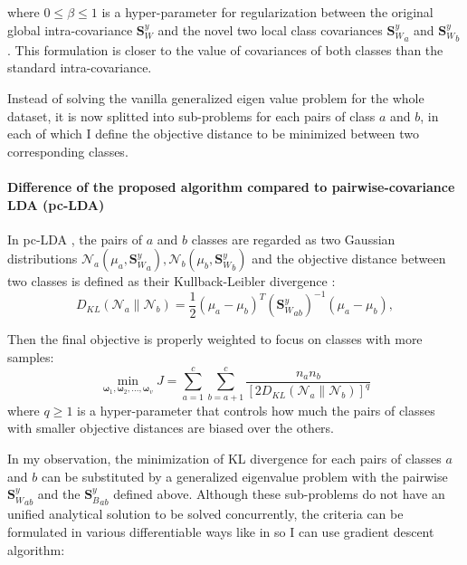     where $0\le\beta\le1$ is a hyper-parameter for regularization between the original global intra-covariance ${\boldsymbol{S}_W^y}$ and the novel two local class covariances ${\boldsymbol{S}_W^y}_a$ and ${\boldsymbol{S}_W^y}_b$.
    This formulation is closer to the value of covariances of both classes than the standard intra-covariance.

    Instead of solving the vanilla generalized eigen value problem for the whole dataset, it is now splitted into sub-problems for each pairs of class $a$ and $b$, in each of which I define the objective distance to be minimized between two corresponding classes.

    \paragraph{Difference of the proposed algorithm compared to pairwise-covariance LDA (pc-LDA)}
        In pc-LDA \cite{kong2014pairwise}, the pairs of $a$ and $b$ classes are regarded as two Gaussian distributions $\mathcal{N}_a(\mu_a,{\boldsymbol{S}_W^y}_a), \mathcal{N}_b(\mu_b,{\boldsymbol{S}_W^y}_b)$ and the objective distance between two classes is defined as their Kullback-Leibler divergence \cite{kullback1951}:
        \begin{equation}
            D_{KL}\left(\mathcal{N}_a\parallel\mathcal{N}_b\right)=\frac{1}{2}\left(\mu_a-\mu_b\right)^{T}{\left({\boldsymbol{S}_W^y}_{ab}\right)}^{-1}\left(\mu_a-\mu_b\right),
        \end{equation}

        Then the final objective is properly weighted to focus on classes with more samples:
        \begin{equation}
            \operatorname*{min}_{\boldsymbol{\omega}_1, \boldsymbol{\omega}_2,...,
            \boldsymbol{\omega}_v}{J}=\sum_{a=1}^{c}\sum_{b=a+1}^{c}{\frac{n_an_b}{{[2D_{KL}\left(\mathcal{N}_a\parallel\mathcal{N}_b\right)]}^q}}
            \label{eq:pc-LDA}
        \end{equation}
        where $q\ge1$ is a hyper-parameter that controls how much the pairs of classes with smaller objective distances are biased over the others.

        In my observation, the minimization of KL divergence for each pairs of classes $a$ and $b$ can be substituted by a generalized eigenvalue problem with the pairwise ${\boldsymbol{S}_W^y}_{ab}$ and the ${\boldsymbol{S}_B^y}_{ab}$ defined above.
        Although these sub-problems do not have an unified analytical solution to be solved concurrently, the criteria can be formulated in various differentiable ways like in \cite{fukunaga1990441} so I can use gradient descent algorithm:

